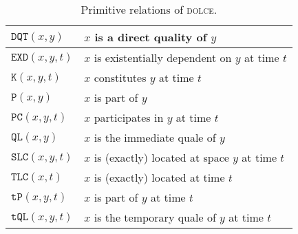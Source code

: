 \documentclass[ao]{iosart2x}
\newcommand{\pr}[1]{\mathtt{#1}}
\newcommand{\dolce}{{\textsc{dolce}}}
\newcommand {\TPd} {\ensuremath{\pr{tP}}}
\newcommand {\Pd} {\ensuremath{\pr{P}}}
\newcommand {\DQTd} {\ensuremath{\pr{DQT}}}
\newcommand {\QLd} {\ensuremath{\pr{QL}}}
\newcommand {\TQLd} {\ensuremath{\pr{tQL}}}
\newcommand {\PCd} {\ensuremath{\pr{PC}}}
\newcommand {\Kd} {\ensuremath{\pr{K}}}
\newcommand {\EXDd} {\ensuremath{\pr{EXD}}}
\newcommand {\SLCd} {\ensuremath{\pr{SLC}}}
\newcommand {\TLCd} {\ensuremath{\pr{TLC}}}
\begin{document}
%

\begin{table*}
\caption{Primitive relations of {\dolce}.}\label{table_prim_dolce}
\begin{tabular}{|l|l|}
\hline
$\DQTd(x,y)$ & $x$ is a direct quality of $y$ \\
\hline
$\EXDd(x,y,t)$ & $x$ is existentially dependent on $y$ at time $t$\\
\hline
$\Kd(x,y,t)$ & $x$ constitutes $y$  at time $t$ \\
\hline
$\Pd(x,y)$ & $x$ is part of $y$ \\
\hline
$\PCd(x,y,t)$ & $x$ participates in $y$ at time $t$\\
\hline
$\QLd(x,y)$ & $x$ is the immediate quale of $y$ \\
\hline
$\SLCd(x,y,t)$ & $x$ is (exactly) located at space $y$ at time $t$\\
\hline
$\TLCd(x,t)$ & $x$ is (exactly) located at time $t$ \\
\hline
$\TPd(x,y,t)$ & $x$ is part of $y$ at time $t$ \\
\hline
$\TQLd(x,y,t)$ & $x$ is the temporary quale of $y$ at time $t$\\
\hline
\end{tabular}
\end{table*}

\end{document}
